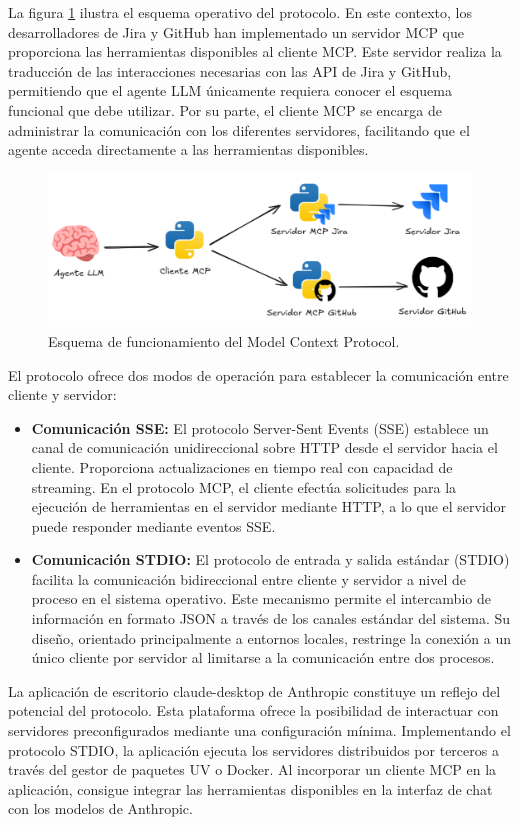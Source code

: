 La figura \ref{fig:mcp} ilustra el esquema operativo del protocolo. En este contexto, los desarrolladores de Jira y GitHub han implementado un servidor MCP que proporciona las herramientas disponibles al cliente MCP. Este servidor realiza la traducción de las interacciones necesarias con las API de Jira y GitHub, permitiendo que el agente LLM únicamente requiera conocer el esquema funcional que debe utilizar. Por su parte, el cliente MCP se encarga de administrar la comunicación con los diferentes servidores, facilitando que el agente acceda directamente a las herramientas disponibles.

\begin{figure}
  \centering
  \includegraphics[width=1\linewidth]{figures/mcp.png}
  \caption{Esquema de funcionamiento del Model Context Protocol.}
  \label{fig:mcp}
\end{figure}


El protocolo ofrece dos modos de operación para establecer la comunicación entre cliente y servidor:
\begin{itemize}
  \item{\textbf{Comunicación SSE: } El protocolo Server-Sent Events (SSE) establece un canal de comunicación unidireccional sobre HTTP desde el servidor hacia el cliente. Proporciona actualizaciones en tiempo real con capacidad de streaming. En el protocolo MCP, el cliente efectúa solicitudes para la ejecución de herramientas en el servidor mediante HTTP, a lo que el servidor puede responder mediante eventos SSE.}
\item{\textbf{Comunicación STDIO: } El protocolo de entrada y salida estándar (STDIO) facilita la comunicación bidireccional entre cliente y servidor a nivel de proceso en el sistema operativo. Este mecanismo permite el intercambio de información en formato JSON a través de los canales estándar del sistema. Su diseño, orientado principalmente a entornos locales, restringe la conexión a un único cliente por servidor al limitarse a la comunicación entre dos procesos.}
\end{itemize}
La aplicación de escritorio claude-desktop de Anthropic constituye un reflejo del potencial del protocolo. Esta plataforma ofrece la posibilidad de interactuar con servidores preconfigurados mediante una configuración mínima. Implementando el protocolo STDIO, la aplicación ejecuta los servidores distribuidos por terceros a través del gestor de paquetes UV o Docker. Al incorporar un cliente MCP en la aplicación, consigue integrar las herramientas disponibles en la interfaz de chat con los modelos de Anthropic.


